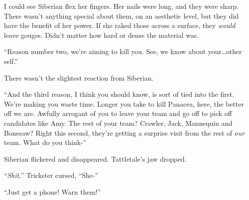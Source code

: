 I could see Siberian flex her fingers.  Her nails were long, and they were sharp.  There wasn't anything special about them, on an aesthetic level, but they did have the benefit of her power.  If she raked those across a surface, they \emph{would} leave gouges.  Didn't matter how hard or dense the material was.



``Reason number two, we're aiming to kill you.  See, we know about your\ldots other self.''



There wasn't the slightest reaction from Siberian.



``And the third reason, I think you should know, is sort of tied into the first.  We're making you waste time.  Longer you take to kill Panacea, here, the better off we are.  Awfully arrogant of you to leave your team and go off to pick off candidates like Amy.  The rest of your team?  Crawler, Jack, Mannequin and Bonesaw?  Right this second, they're getting a surprise visit from the rest of \emph{our} team.  What do you think-''



Siberian flickered and disappeared.  Tattletale's jaw dropped.



``\emph{Shit},'' Trickster cursed, ``She-''



``Just get a phone!  Warn them!''





